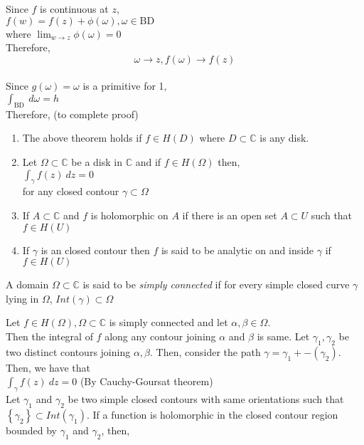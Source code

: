 Since $f$ is continuous at $z$, \\
	$f\left( w \right)  = f\left( z \right)  + \phi\left( \omega \right), \omega \in \text{BD}$\\
where $\lim_{w \to z} \phi(\omega) = 0$\\
Therefore, $$\omega \to z, f(\omega) \to  f \left( z \right) $$ \\

Since $g\left( \omega \right) = \omega$ is a primitive for 1,\\
$\int_{{\text{BD}}}^{{}} {} \: d{\omega} {} = h$\\
Therefore, (to complete proof)
\begin{rem}
\begin{enumerate}
\item The above theorem holds if $f \in  H\left( D \right) $ where $D \subset \mathds{C}$ is any disk. 
\item Let $\Omega \subset \mathds{C}$ be a disk in $\mathds{C}$ and if $f \in H\left( \Omega \right) $ then, \\
	$\int_{{\gamma}}^{{}} {f\left( z \right) } \: d{z} {} = 0$\\
	for any closed contour $\gamma \subset \Omega$
\item If $A \subset \mathds{C}$ and $f$ is holomorphic on $A $ if there is an open set $A \subset U$ such that $f \in  H \left( U \right) $ \\
\item If $\gamma$ is an closed contour then $f $ is said to be analytic on and inside $\gamma$ if $f \in H\left( U \right) $
\end{enumerate}
\end{rem}
\begin{defn}
A domain $\Omega \subset \mathds{C}$ is said to be \emph{simply connected} if for every simple closed curve $\gamma$ lying in $\Omega$,   $Int\left( \gamma \right) \subset \Omega$
\end{defn}
Let $f \in H\left( \Omega \right) , \Omega \subset \mathds{C}$ is simply connected and let $\alpha, \beta \in  \Omega$.\\
Then the integral of $f$ along any contour joining $\alpha$	and $\beta$ is same.  
Let $\gamma_1, \gamma_2$ be two distinct contours joining $\alpha, \beta$. Then, consider the path $\gamma = \gamma_1 + -\left( \gamma_2 \right) $. Then, we have that \\
$\int_{{\gamma}}^{{}} {f\left( z \right) } \: d{z} {} = 0$ (By Cauchy-Goursat theorem)\\
\vspace{2mm}
Let $\gamma_1$ and $\gamma_2$ be two simple closed contours with same orientations such that $\left\{ \gamma_2 \right\} \subset Int\left( \gamma_1 \right) $. If a function is holomorphic in the closed contour region bounded by $\gamma_1$ and $\gamma_2$, then, 

